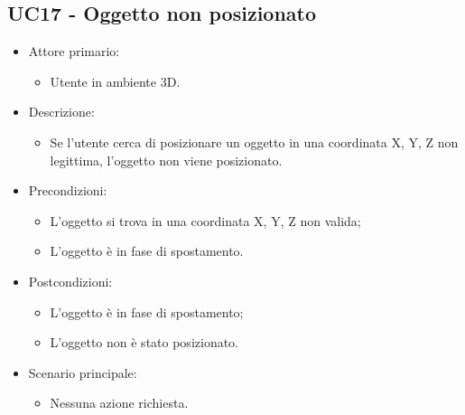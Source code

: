 \subsection{UC17 - Oggetto non posizionato}
\begin{itemize}

	\item Attore primario: 
	\begin{itemize}
		\item Utente in ambiente 3D.
	\end{itemize}
	\item Descrizione:
	\begin{itemize}
		\item Se l'utente cerca di posizionare un oggetto in una coordinata X, Y, Z non legittima, l'oggetto non viene posizionato.
	\end{itemize}
	
	\item Precondizioni:
	\begin{itemize}
		\item L'oggetto si trova in una coordinata X, Y, Z non valida;
		\item L'oggetto è in fase di spostamento.
	\end{itemize}
	
	\item Postcondizioni:
	\begin{itemize}
		\item L'oggetto è in fase di spostamento;
		\item L'oggetto non è stato posizionato.
	\end{itemize}
	
	\item Scenario principale:
	\begin{itemize}
		\item Nessuna azione richiesta.
	\end{itemize}
	
\end{itemize}

\pagebreak

